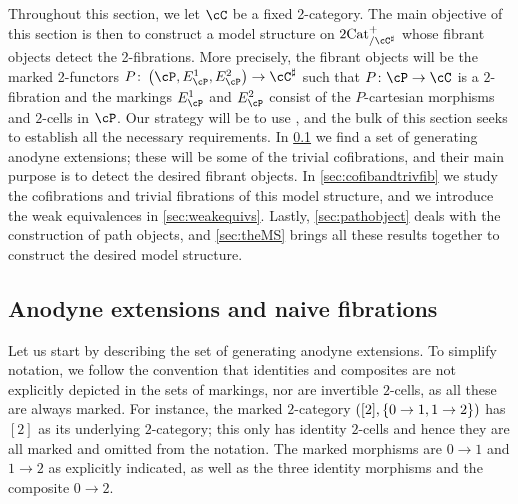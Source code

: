 \documentclass[11pt, dvipsnames]{amsart}
\begin{document}
	Throughout this section, we let $\cC$ be a fixed 2-category. The main objective of this section is then to construct a model structure on $\twocat^{+}_{/\cC^\sharp}$ whose fibrant objects detect the 2-fibrations. More precisely, the fibrant objects will be the marked 2-functors $P\colon \markedscat{\cP}\to\Csharp$ such that $P\colon\cP\to\cC$ is a $2$-fibration and the markings $E^1_\cP$ and $E^2_\cP$ consist of the $P$-cartesian morphisms and $2$-cells in $\cP$. Our strategy will be to use \cite[Theorem 2.8]{guetta2023fibrantlyinduced}, and the bulk of this section seeks to establish all the necessary requirements. In \cref{sec:anodyne} we find a set of generating anodyne extensions; these will be some of the trivial cofibrations, and their main purpose is to detect the desired fibrant objects. In \cref{sec:cofibandtrivfib} we study the cofibrations and trivial fibrations of this model structure, and we introduce the weak equivalences in \cref{sec:weakequivs}. Lastly, \cref{sec:pathobject} deals with the construction of path objects, and \cref{sec:theMS} brings all these results together to construct the desired model structure. 

	\subsection{Anodyne extensions and naive fibrations}\label{sec:anodyne}
		Let us start by describing the set of generating anodyne extensions. To simplify notation, we follow the convention that identities and composites are not explicitly depicted in the sets of markings, nor are invertible $2$-cells, as all these are always marked. For instance, the marked $2$-category $([2], \left\lbrace 0\to 1, 1 \to 2 \right\rbrace)$ has $[2]$ as its underlying $2$-category; this only has identity $2$-cells and hence they are all marked and omitted from the notation. The marked morphisms are $0 \to 1$ and $1 \to 2$ as explicitly indicated, as well as the three identity morphisms and the composite $0 \to 2$.
\end{document}
